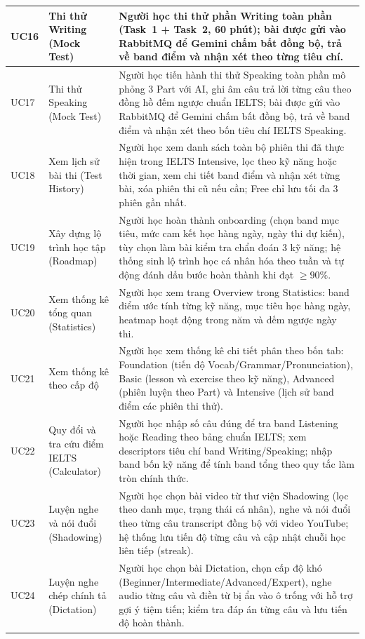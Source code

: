 \begin{longtable}{|p{15\tbu}|p{45\tbu}|p{90\tbu}|}
    UC16 & Thi thử Writing (Mock Test) & Người học thi thử phần Writing toàn phần (Task~1 + Task~2, 60 phút); bài được gửi vào RabbitMQ để Gemini chấm bất đồng bộ, trả về band điểm và nhận xét theo từng tiêu chí. \\ \hline
    UC17 & Thi thử Speaking (Mock Test) & Người học tiến hành thi thử Speaking toàn phần mô phỏng 3 Part với AI, ghi âm câu trả lời từng câu theo đồng hồ đếm ngược chuẩn IELTS; bài được gửi vào RabbitMQ để Gemini chấm bất đồng bộ, trả về band điểm và nhận xét theo bốn tiêu chí IELTS Speaking. \\ \hline
    UC18 & Xem lịch sử bài thi (Test History) & Người học xem danh sách toàn bộ phiên thi đã thực hiện trong IELTS Intensive, lọc theo kỹ năng hoặc thời gian, xem chi tiết band điểm và nhận xét từng bài, xóa phiên thi cũ nếu cần; Free chỉ lưu tối đa 3 phiên gần nhất. \\ \hline
    UC19 & Xây dựng lộ trình học tập (Roadmap) & Người học hoàn thành onboarding (chọn band mục tiêu, mức cam kết học hàng ngày, ngày thi dự kiến), tùy chọn làm bài kiểm tra chẩn đoán 3 kỹ năng; hệ thống sinh lộ trình học cá nhân hóa theo tuần và tự động đánh dấu bước hoàn thành khi đạt $\geq 90\%$. \\ \hline
    UC20 & Xem thống kê tổng quan (Statistics) & Người học xem trang Overview trong Statistics: band điểm ước tính từng kỹ năng, mục tiêu học hàng ngày, heatmap hoạt động trong năm và đếm ngược ngày thi. \\ \hline
    UC21 & Xem thống kê theo cấp độ & Người học xem thống kê chi tiết phân theo bốn tab: Foundation (tiến độ Vocab/Grammar/Pronunciation), Basic (lesson và exercise theo kỹ năng), Advanced (phiên luyện theo Part) và Intensive (lịch sử band điểm các phiên thi thử). \\ \hline
    UC22 & Quy đổi và tra cứu điểm IELTS (Calculator) & Người học nhập số câu đúng để tra band Listening hoặc Reading theo bảng chuẩn IELTS; xem descriptors tiêu chí band Writing/Speaking; nhập band bốn kỹ năng để tính band tổng theo quy tắc làm tròn chính thức. \\ \hline
    UC23 & Luyện nghe và nói đuổi (Shadowing) & Người học chọn bài video từ thư viện Shadowing (lọc theo danh mục, trạng thái cá nhân), nghe và nói đuổi theo từng câu transcript đồng bộ với video YouTube; hệ thống lưu tiến độ từng câu và cập nhật chuỗi học liên tiếp (streak). \\ \hline
    UC24 & Luyện nghe chép chính tả (Dictation) & Người học chọn bài Dictation, chọn cấp độ khó (Beginner/Intermediate/Advanced/Expert), nghe audio từng câu và điền từ bị ẩn vào ô trống với hỗ trợ gợi ý tiệm tiến; kiểm tra đáp án từng câu và lưu tiến độ hoàn thành. \\ \hline

\end{longtable}

